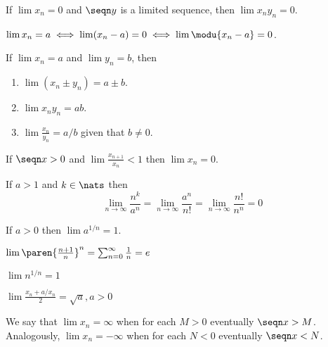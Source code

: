 \begin{theorem}
	If $\lim x_n = 0$ and $\seqn y$ is a limited sequence, then $\lim x_ny_n=0$.
\end{theorem}

\begin{fact}
	$\lim x_n = a \iff \lim (x_n - a) = 0 \iff \lim \modu{x_n - a} = 0$.
\end{fact}

\begin{theorem}
	If $\lim x_n = a$ and $\lim y_n = b$, then
	\begin{enumerate}
		\item $\lim (x_n \pm y_n) = a \pm b$.
		\item $\lim x_n y_n = ab$.
		\item $\lim \frac{x_n}{y_n} = a/b$ given that $b \ne 0$.
	\end{enumerate}
\end{theorem}

\begin{fact}
	If $\seqn x > 0$ and $\lim \frac{x_{n+1}}{x_n}<1$ then $\lim x_n=0$.
\end{fact}

\begin{fact}
	If $a > 1$ and $k \in \nats$ then $$\lim\limits_{n\to\infty} \frac{n^k}{a^n} = 
	\lim\limits_{n\to\infty} \frac{a^n}{n!} = \lim\limits_{n\to\infty} \frac{n!}{n^n}
	=0$$
\end{fact}

\begin{fact}
	If $a>0$ then $\lim a^{1/n}=1$.
\end{fact}

\begin{fact}
	$\lim \paren{\frac{n+1}{n}}^n = \sum_{n=0}^{\infty}\frac1n = e$
\end{fact}

\begin{fact}
	$\lim n^{1/n}=1$
\end{fact}

\begin{fact}
	$\lim\frac{x_n+a/x_n}2=\sqrt a, a>0$
\end{fact}

\begin{definition}
	We say that $\lim x_n = \infty$ when for each $M>0$ eventually $\seqn x > M$. 
	Analogously, $\lim x_n = -\infty$ when for each $N<0$ eventually $\seqn x < N$.
\end{definition}

